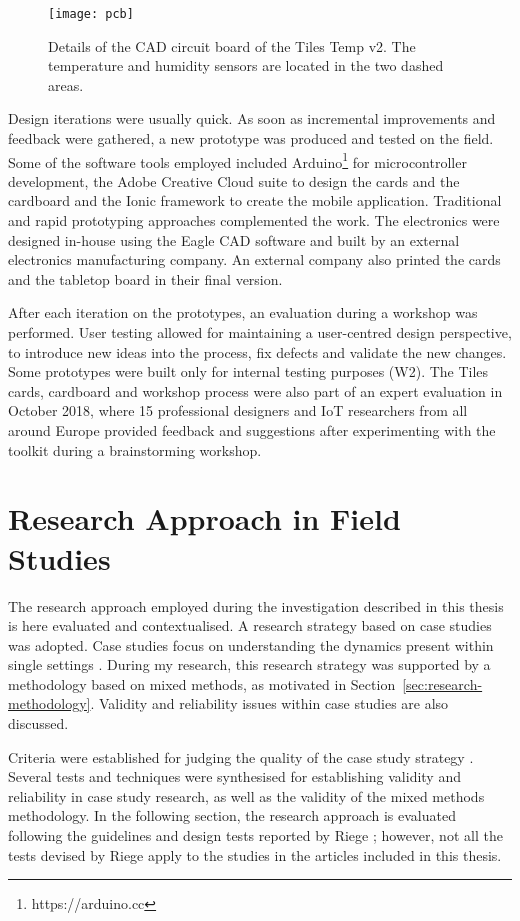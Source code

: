 \begin{figure}[ptb]
    \centering 
	\texttt{[image: pcb]}
	\caption{Details of the CAD circuit board of the Tiles Temp v2. The temperature and humidity sensors are located in the two dashed areas.}
	\label{fig:pcb}
\end{figure}

Design iterations were usually quick. As soon as incremental improvements and feedback were gathered, a new prototype was produced and tested on the field. Some of the software tools employed included Arduino\footnote{https://arduino.cc} for microcontroller development, the Adobe Creative Cloud suite to design the cards and the cardboard and the Ionic framework to create the mobile application.
Traditional and rapid prototyping approaches complemented the work. The electronics were designed in-house using the Eagle CAD software and built by an external electronics manufacturing company. An external company also printed the cards and the tabletop board in their final version.

After each iteration on the prototypes, an evaluation during a workshop was performed. User testing allowed for maintaining a user-centred design perspective, to introduce new ideas into the process, fix defects and validate the new changes. Some prototypes were built only for internal testing purposes (W2). The Tiles cards, cardboard and workshop process were also part of an expert evaluation in October 2018, where 15 professional designers and IoT researchers from all around Europe provided feedback and suggestions after experimenting with the toolkit during a brainstorming workshop.


\section{Research Approach in Field Studies}

The research approach employed during the investigation described in this thesis is here evaluated and contextualised. A research strategy based on case studies was adopted. Case studies focus on understanding the dynamics present within single settings \autocites{eisenhardt_building_1989}. During my research, this research strategy was supported by a methodology based on mixed methods, as motivated in Section~\ref{sec:research-methodology}. Validity and reliability issues within case studies \autocites{yin_case_2017}{riege_validity_2003} are also discussed.

Criteria were established for judging the quality of the case study strategy \autocite{riege_validity_2003}. Several tests and techniques were synthesised for establishing validity and reliability in case study research, as well as the validity of the mixed methods methodology.
In the following section, the research approach is evaluated following the guidelines and design tests reported by Riege \autocite*{riege_validity_2003}; however, not all the tests devised by Riege apply to the studies in the articles included in this thesis.

